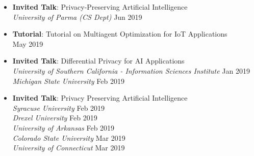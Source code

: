 \begin{itemize}
  \item {\bf Invited Talk}: 
  Privacy-Preserving Artificial Intelligence\\
  {\em University of Parma (CS Dept)} 
  \hfill {Jun 2019}

  \item {\bf Tutorial}: {Tutorial on Multiagent Optimization for IoT Applications}\\ 
  \hfill {May 2019}

  \item {\bf Invited Talk}: Differential Privacy for AI Applications\\
  {\em University of Southern California - Information Sciences Institute} \hfill {Jan 2019}\\
  {\em Michigan State University} \hfill {Feb 2019}

  \item {\bf Invited Talk}: Privacy Preserving Artificial Intelligence\\
  {\em Syracuse University} \hfill {Feb 2019}\\
  {\em Drexel University} \hfill {Feb 2019}\\
  {\em University of Arkansas} \hfill {Feb 2019}\\
  {\em Colorado State University} \hfill {Mar 2019}\\
  {\em University of Connecticut} \hfill {Mar 2019}







\end{itemize}
